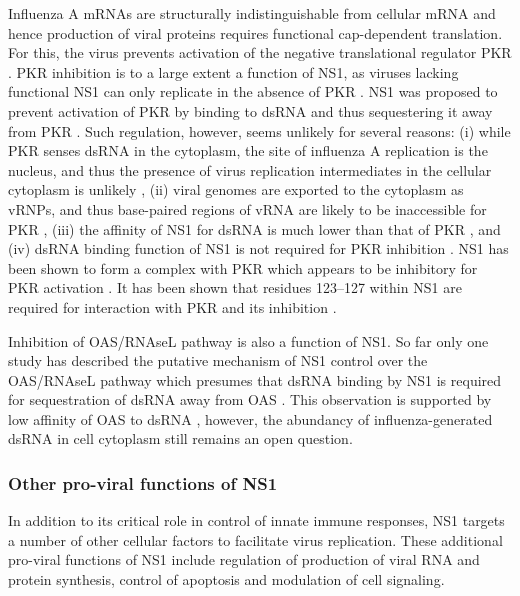 		Influenza A mRNAs are structurally indistinguishable from cellular mRNA and hence production of viral proteins requires functional cap-dependent translation. For this, the virus prevents activation of the negative translational regulator \gls{PKR}  \parencite{Katze1986, Katze1988}. \gls{PKR} inhibition is to a large extent a function of \gls{NS1}, as viruses lacking functional \gls{NS1} can only replicate in the absence of \gls{PKR} \parencite{Bergmann2000a}. \gls{NS1} was proposed to prevent activation of \gls{PKR} by binding to dsRNA and thus sequestering it away from \gls{PKR} \parencite{Lu1995}. Such regulation, however, seems unlikely for several reasons: (i) while \gls{PKR} senses dsRNA in the cytoplasm, the site of influenza A replication is the nucleus, and thus the presence of virus replication intermediates in the cellular cytoplasm is unlikely \parencite{Jackson1982}, (ii) viral genomes are exported to the cytoplasm as \gls{vRNP}s, and thus base-paired regions of \gls{vRNA} are likely to be inaccessible for \gls{PKR} \parencite{Coloma2009}, (iii) the affinity of \gls{NS1} for dsRNA is much lower than that of \gls{PKR} \parencite{Chien2004, Husain2012}, and (iv) dsRNA binding function of \gls{NS1} is not required for \gls{PKR} inhibition \parencite{Li2006}. \gls{NS1} has been shown to form a complex with \gls{PKR} which appears to be inhibitory for \gls{PKR} activation \parencite{Tan1998, Li2006}. It has been shown that residues 123--127 within \gls{NS1} are required for interaction with \gls{PKR} and its inhibition \parencite{Min2007}.	
				
		Inhibition of \gls{OAS}/\gls{RNAseL} pathway is also a function of \gls{NS1}. So far only one study has described the putative mechanism of \gls{NS1} control over the \gls{OAS}/\gls{RNAseL} pathway which presumes that dsRNA binding by NS1 is required for sequestration of dsRNA away from \gls{OAS} \parencite{Min2006}. This observation is supported by low affinity of \gls{OAS} to dsRNA \parencite{Hartmann2003}, however, the abundancy of influenza-generated dsRNA in cell cytoplasm still remains an open question.
		
		\subsubsection{Other pro-viral functions of NS1}
		
		In addition to its critical role in control of innate immune responses, NS1 targets a number of other cellular factors to facilitate virus replication. These additional pro-viral functions of NS1 include regulation of production of viral RNA and protein synthesis, control of apoptosis and modulation of cell signaling.
		

